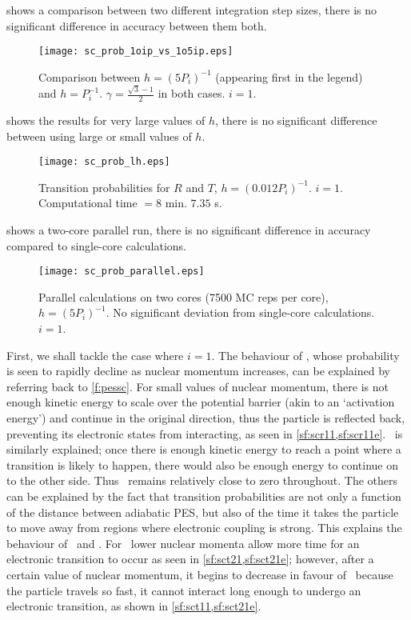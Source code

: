  shows a comparison between two different integration step sizes, there is no significant difference in accuracy between them both.
\begin{figure}
\centering
\texttt{[image: sc\_prob\_1oip\_vs\_1o5ip.eps]}
\caption[Single avoided crossing: comparison between integration step size. $ i = 1 $.]{Comparison between $ h = (5P_{i})^{-1} $ (appearing first in the legend) and $ h = P_{i}^{-1} $. $ \gamma = \frac{\sqrt{3} - 1}{2}$ in both cases. $ i = 1 $.}
\label{f:scc}
\end{figure}
 shows the results for very large values of $ h $, there is no significant difference between using large or small values of $ h $.
\begin{figure}
\centering
\texttt{[image: sc\_prob\_lh.eps]}
\caption[Single avoided crossing: large integration step. $ i = 1 $.]{Transition probabilities for $ R $ and $ T $, $ h = (0.012P_{i})^{-1} $. $ i = 1 $. Computational time $ = 8$ min. $ 7.35 $ s.}
\label{f:sclh}
\end{figure}
 shows a two-core parallel run, there is no significant difference in accuracy compared to single-core calculations.
\begin{figure}
\centering
\texttt{[image: sc\_prob\_parallel.eps]}
\caption[Single avoided crossing: parallel calculations. $ i = 1 $.]{Parallel calculations on two cores (7500 MC reps per core), $ h = (5P_{i})^{-1} $. No significant deviation from single-core calculations. $ i = 1 $.}
\label{f:scpar}
\end{figure}

First, we shall tackle the case where $ i = 1 $. The behaviour of \roo, whose probability is seen to rapidly decline as nuclear momentum increases, can be explained by referring back to \cref{f:pessc}. For small values of nuclear momentum, there is not enough kinetic energy to scale over the potential barrier (akin to an `activation energy') and continue in the original direction, thus the particle is reflected back, preventing its electronic states from interacting, as seen in \cref{sf:scr11,sf:scr11e}. \rto~is similarly explained; once there is enough kinetic energy to reach a point where a transition is likely to happen, there would also be enough energy to continue on to the other side. Thus \rto~remains relatively close to zero throughout. The others can be explained by the fact that transition probabilities are not only a function of the distance between adiabatic PES, but also of the time it takes the particle to move away from regions where electronic coupling is strong. This explains the behaviour of \tto~and \too. For \tto~lower nuclear momenta allow more time for an electronic transition to occur as seen in \cref{sf:sct21,sf:sct21e}; however, after a certain value of nuclear momentum, it begins to decrease in favour of \too~because the particle travels so fast, it cannot interact long enough to undergo an electronic transition, as shown in \cref{sf:sct11,sf:sct21e}.

